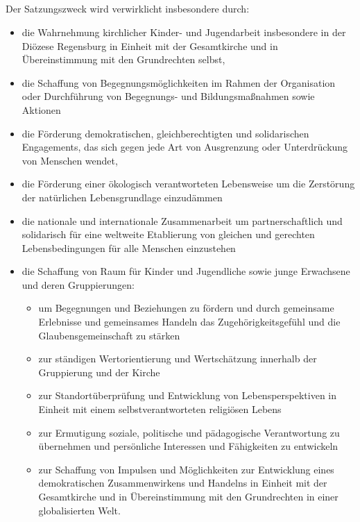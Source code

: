 \documentclass[12pt]{report}
\begin{document}
\begin{flushleft}
\subsection{}
Der Satzungszweck wird verwirklicht insbesondere durch:
\begin{itemize}
  \item die Wahrnehmung kirchlicher Kinder- und Jugendarbeit insbesondere in der Diözese Regensburg
        in Einheit mit der Gesamtkirche und in Übereinstimmung mit den Grundrechten selbst,
  \item die Schaffung von Begegnungsmöglichkeiten im Rahmen der Organisation oder Durchführung von
        Begegnungs- und Bildungsmaßnahmen sowie Aktionen
  \item die Förderung demokratischen, gleichberechtigten und solidarischen Engagements, das sich
        gegen jede Art von Ausgrenzung oder Unterdrückung von Menschen wendet,
  \item die Förderung einer ökologisch verantworteten Lebensweise um die Zerstörung der
          natürlichen Lebensgrundlage einzudämmen
  \item die nationale und internationale Zusammenarbeit um partnerschaftlich und solidarisch für
        eine weltweite Etablierung von gleichen und gerechten Lebensbedingungen für alle Menschen einzustehen
  \item die Schaffung von Raum für Kinder und Jugendliche sowie junge Erwachsene und deren
        Gruppierungen:
    \begin{itemize}
      \item um Begegnungen und Beziehungen zu fördern und durch gemeinsame Erlebnisse und gemeinsames Handeln
            das Zugehörigkeitsgefühl und die Glaubensgemeinschaft zu stärken
      \item zur ständigen Wertorientierung und Wertschätzung innerhalb der Gruppierung und der Kirche
      \item zur Standortüberprüfung und Entwicklung von Lebensperspektiven in Einheit mit einem 
            selbstverantworteten religiösen Lebens
      \item zur Ermutigung soziale, politische und pädagogische Verantwortung zu übernehmen und 	
            persönliche Interessen und Fähigkeiten zu entwickeln
      \item zur Schaffung von Impulsen und Möglichkeiten zur Entwicklung eines demokratischen Zusammenwirkens
            und Handelns in Einheit mit der Gesamtkirche und in Übereinstimmung 
            mit den Grundrechten in einer globalisierten Welt.
    \end{itemize}
\end{itemize}

\end{flushleft}
\end{document}
